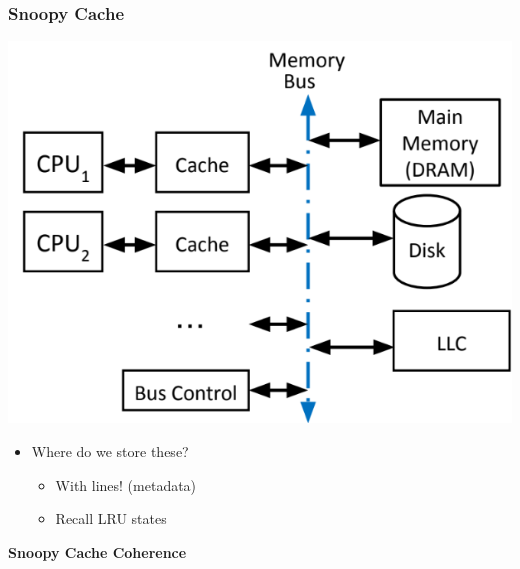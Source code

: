 \documentclass[10pt]{article}
\begin{document}
\subsubsection*{Snoopy Cache}
    \begin{center}
        \includegraphics*[scale=0.7]{W8_9.png}
    \end{center}
    \begin{itemize}
        \item Where do we store these?
        \begin{itemize}
            \item With lines!  (metadata)
            \item Recall LRU states
        \end{itemize}
    \end{itemize}
    \textbf{Snoopy Cache Coherence}
\end{document}

